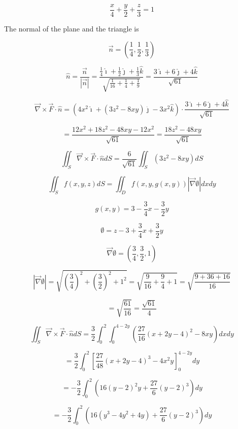 \documentclass[12pt]{article}
\begin{document}
\[
    \frac{x}{4} + \frac{y}{2} + \frac{z}{3} = 1
\]

The normal of the plane and the triangle is

\[
    \vec{n} = \left( \frac{1}{4}, \frac{1}{2}, \frac{1}{3} \right)
\]

\[
    \hat{n} = \frac{\vec{n}}{\left| \vec{n} \right|}
    = \frac{\frac{1}{4} \hat{\imath} + \frac{1}{2} \hat{\jmath} + \frac{1}{3} \hat{k}}{\sqrt{\frac{1}{16} + \frac{1}{4} + \frac{1}{9}}}
    = \frac{3 \hat{\imath} + 6 \hat{\jmath} + 4 \hat{k}}{\sqrt{61}}
\]

\[
    \vec{\nabla} \times \vec{F} \cdot \hat{n}
    = \left(
    4 x^2 \hat{\imath}
    + \left(3 z^2 - 8 x y\right) \hat{\jmath}
    - 3 x^2 \hat{k}
    \right) \cdot
    \frac{3 \hat{\imath} + 6 \hat{\jmath} + 4 \hat{k}}{\sqrt{61}}
\]

\[
    = \frac{12 x^2 + 18 z^2 - 48 x y - 12 x^2}{\sqrt{61}}
    = \frac{18 z^2 - 48 x y}{\sqrt{61}}
\]

\[
    \iint_S \vec{\nabla} \times \vec{F} \cdot \hat{n} d S
    = \frac{6}{\sqrt{61}} \iint_S \left(3 z^2 - 8 x y\right)  d S
\]

\[
    \iint_S f(x, y, z) d S= \iint_D f(x, y, g(x, y))|\vec{\nabla} \emptyset| d x d y
\]

\[
    g(x, y) = 3 - \frac{3}{4} x - \frac{3}{2} y
\]

\[
    \emptyset = z - 3 + \frac{3}{4} x + \frac{3}{2} y
\]

\[
    \vec{\nabla} \emptyset = \left( \frac{3}{4}, \frac{3}{2}, 1 \right)
\]

\[
    |\vec{\nabla} \emptyset| = \sqrt{{\left( \frac{3}{4} \right)}^2 + {\left( \frac{3}{2} \right)}^2 + 1^2}
    = \sqrt{\frac{9}{16} + \frac{9}{4} + 1}
    = \sqrt{\frac{9 + 36 + 16}{16}}
\]

\[
    = \sqrt{\frac{61}{16}}
    = \frac{\sqrt{61}}{4}
\]

\[
    \iint_S \vec{\nabla} \times \vec{F} \cdot \hat{n} d S
    = \frac{3}{2} \int_0^2 \int_0^{4-2y} \left(\frac{27}{16} {\left(x + 2y - 4\right)}^2 - 8 x y\right)  dx dy
\]


\[
    = \frac{3}{2} \int_0^2 {\left[\frac{27}{48} {\left(x + 2y - 4\right)}^3 - 4 x^2 y\right]}_0^{4-2y} dy
\]

\[
    = - \frac{3}{2} \int_0^2 {\left(16 \left(y-2\right)^2 y + \frac{27}{6} {\left(y - 2\right)}^3\right) } dy
\]

\[
    = - \frac{3}{2} \int_0^2 {\left(16 \left(y^3-4y^2+4y\right) + \frac{27}{6} {\left(y - 2\right)}^3\right) } dy
\]
\end{document}

